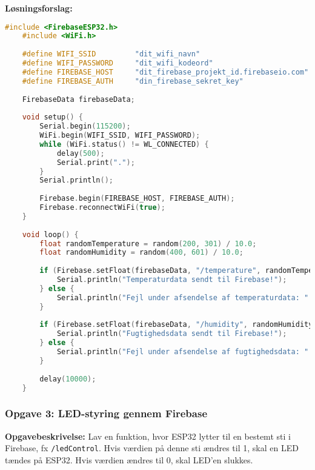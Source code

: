 \textbf{Løsningsforslag:}
\begin{lstlisting}[language=C++]
	#include <FirebaseESP32.h>
	#include <WiFi.h>
	
	#define WIFI_SSID         "dit_wifi_navn"
	#define WIFI_PASSWORD     "dit_wifi_kodeord"
	#define FIREBASE_HOST     "dit_firebase_projekt_id.firebaseio.com"
	#define FIREBASE_AUTH     "din_firebase_sekret_key"
	
	FirebaseData firebaseData;
	
	void setup() {
		Serial.begin(115200);
		WiFi.begin(WIFI_SSID, WIFI_PASSWORD);
		while (WiFi.status() != WL_CONNECTED) {
			delay(500);
			Serial.print(".");
		}
		Serial.println();
		
		Firebase.begin(FIREBASE_HOST, FIREBASE_AUTH);
		Firebase.reconnectWiFi(true);
	}
	
	void loop() {
		float randomTemperature = random(200, 301) / 10.0;
		float randomHumidity = random(400, 601) / 10.0;
		
		if (Firebase.setFloat(firebaseData, "/temperature", randomTemperature)) {
			Serial.println("Temperaturdata sendt til Firebase!");
		} else {
			Serial.println("Fejl under afsendelse af temperaturdata: " + firebaseData.errorReason());
		}
		
		if (Firebase.setFloat(firebaseData, "/humidity", randomHumidity)) {
			Serial.println("Fugtighedsdata sendt til Firebase!");
		} else {
			Serial.println("Fejl under afsendelse af fugtighedsdata: " + firebaseData.errorReason());
		}
		
		delay(10000);
	}
\end{lstlisting}
\clearpage
\subsubsection*{Opgave 3: LED-styring gennem Firebase}

\textbf{Opgavebeskrivelse:} Lav en funktion, hvor ESP32 lytter til en bestemt sti i Firebase, fx \texttt{/ledControl}. Hvis værdien på denne sti ændres til 1, skal en LED tændes på ESP32. Hvis værdien ændres til 0, skal LED'en slukkes.

